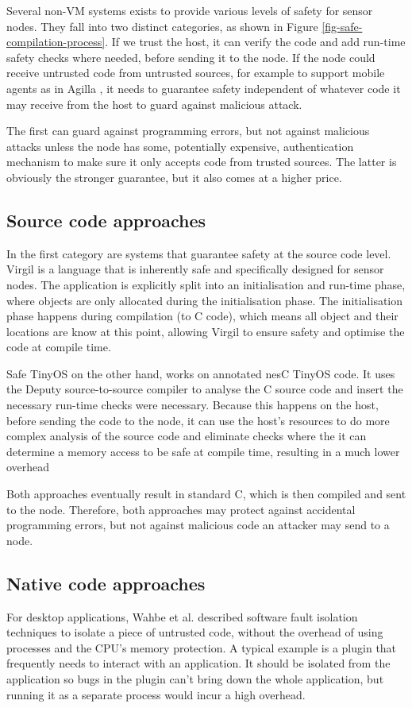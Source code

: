 Several non-VM systems exists to provide various levels of safety for sensor nodes. They fall into two distinct categories, as shown in Figure \ref{fig-safe-compilation-process}. If we trust the host, it can verify the code and add run-time safety checks where needed, before sending it to the node. If the node could receive untrusted code from untrusted sources, for example to support mobile agents as in Agilla \cite{Fok:2005bh}, it needs to guarantee safety independent of whatever code it may receive from the host to guard against malicious attack.

The first can guard against programming errors, but not against malicious attacks unless the node has some, potentially expensive, authentication mechanism to make sure it only accepts code from trusted sources. The latter is obviously the stronger guarantee, but it also comes at a higher price.

\subsection{Source code approaches}
In the first category are systems that guarantee safety at the source code level. Virgil \cite{Titzer:2006uy} is a language that is inherently safe and specifically designed for sensor nodes. The application is explicitly split into an initialisation and run-time phase, where objects are only allocated during the initialisation phase. The initialisation phase happens during compilation (to C code), which means all object and their locations are know at this point, allowing Virgil to ensure safety and optimise the code at compile time.

Safe TinyOS on the other hand, works on annotated nesC TinyOS code. It uses the Deputy \cite{Condit:2007uo} source-to-source compiler to analyse the C source code and insert the necessary run-time checks were necessary. Because this happens on the host, before sending the code to the node, it can use the host's resources to do more complex analysis of the source code and eliminate checks where the it can determine a memory access to be safe at compile time, resulting in a much lower overhead

Both approaches eventually result in standard C, which is then compiled and sent to the node. Therefore, both approaches may protect against accidental programming errors, but not against malicious code an attacker may send to a node.

\subsection{Native code approaches}
For desktop applications, Wahbe et al. described software fault isolation \cite{Wahbe:1994cj} techniques to isolate a piece of untrusted code, without the overhead of using processes and the CPU's memory protection. A typical example is a plugin that frequently needs to interact with an application. It should be isolated from the application so bugs in the plugin can't bring down the whole application, but running it as a separate process would incur a high overhead.

